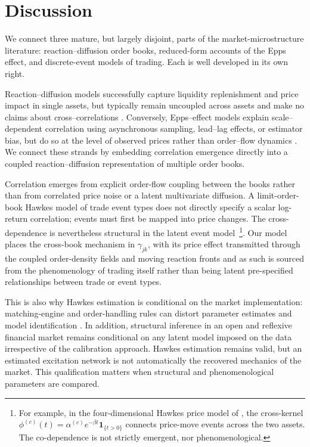 \documentclass[5p,final]{elsarticle}
\begin{document}
\section{Discussion}
\label{sec:discussion}

We connect three mature, but largely disjoint, parts of the market-microstructure literature: reaction--diffusion order books, reduced-form accounts of the Epps effect, and discrete-event models of trading. Each is well developed in its own right.

Reaction--diffusion models successfully capture liquidity replenishment and price impact in single assets, but typically remain uncoupled across assets and make no claims about cross--correlations \citep{donier2015,toth2011,benzaquen2018}. Conversely, Epps--effect models explain scale--dependent correlation using asynchronous sampling, lead--lag effects, or estimator bias, but do so at the level of observed prices rather than order--flow dynamics \citep{epps1979,lo1990,hayashi2005,mastromatteo2011}.
We connect these strands by embedding correlation emergence directly into a coupled reaction--diffusion representation of multiple order books.

Correlation emerges from explicit order-flow coupling between the books rather than from correlated price noise or a latent multivariate diffusion. A limit-order-book Hawkes model of trade event types does not directly specify a scalar log-return correlation; events must first be mapped into price changes. The cross-dependence is nevertheless structural in the latent event model~\footnote{For example, in the four-dimensional Hawkes price model of \citet{chang2025discrete}, the cross-kernel
$\phi^{(c)}(t) =\alpha^{(c)}e^{-\beta t}\mathbf{1}_{\{t>0\}}$
connects price-move events across the two assets. The co-dependence is not strictly emergent, nor phenomenological.}. Our model places the cross-book mechanism in $\gamma_{jk}$, with its price effect transmitted through the coupled order-density fields and moving reaction fronts and as such is sourced from the phenomenology of trading itself rather than being latent pre-specified relationships between trade or event types.

This is also why Hawkes estimation is conditional on the market implementation: matching-engine and order-handling rules can distort parameter estimates and model identification \citep{JericevichChangGebbie2021}. In addition, structural inference in an open and reflexive financial market remains conditional on any latent model imposed on the data \citep{PolakowGebbieFlint2026} irrespective of the calibration approach. Hawkes estimation remains valid, but an estimated excitation network is not automatically the recovered mechanics of the market. This qualification matters when structural and phenomenological parameters are compared.
\end{document}
